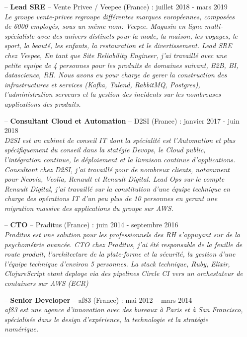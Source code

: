 \documentclass[a4paper,11pt]{article}
\begin{document}
  \begin{itemize}
    \item[--]
      \textbf{Lead SRE} – Vente Privee / Veepee (France) : juillet 2018 - mars 2019\\
      \textit{Le groupe vente-privee regroupe différentes marques européennes, composées de 6000 employés, sous un même nom: Veepee. Magasin en ligne multi-spécialiste avec des univers distincts pour la mode, la maison, les voyages, le sport, la beauté, les enfants, la restauration et le divertissement. Lead SRE chez Veepee, En tant que Site Reliability Engineer, j'ai travaillé avec une petite equipe de 4 personnes pour les produits de domaines suivant, B2B, BI, datascience, RH. Nous avons eu pour charge de gerer la construction des infrastructures et services (Kafka, Talend, RabbitMQ, Postgres), l'administration serveurs et la gestion des incidents sur les nombreuses applications des produits.}
    \item[--]
      \textbf{Consultant Cloud et Automation} – D2SI (France) : janvier 2017 - juin 2018\\
      \textit{D2SI est un cabinet de conseil IT dont la spécialité est l'Automation et plus spécifiquement du conseil dans la statégie Devops, le Cloud public, l'intégration continue, le déploiement et la livraison continue d'applications. Consultant chez D2SI, j'ai travaillé pour de nombreux clients, notamment pour Neovia, Veolia, Renault et Renault Digital. Lead Ops sur le compte Renault Digital, j'ai travaillé sur la constitution d'une équipe technique en charge des opérations IT d'un peu plus de 10 personnes en gerant une migration massive des applications du groupe sur AWS.}
    \item[--]
      \textbf{CTO} – Praditus (France) : juin 2014 - septembre 2016\\
      \textit{Praditus est une solution pour les professionnels des RH s'appuyant sur de la psychométrie avancée. CTO chez Praditus, j'ai été responsable de la feuille de route produit, l'architecture de la plate-forme et la sécurité, la gestion d'une l'équipe technique d'environ 5 personnes. La stack technique, Ruby, Elixir, ClojureScript etant deploye via des pipelines Circle CI vers un orchestateur de containers sur AWS (ECR)}
    \item[--]
      \textbf{Senior Developer} – af83 (France) : mai 2012 – mars 2014\\
      \textit{af83 est une agence d'innovation avec des bureaux à Paris et à San Francisco, spécialisée dans le design d'expérience, la technologie et la stratégie numérique. \\}

\end{itemize}
\end{document}
